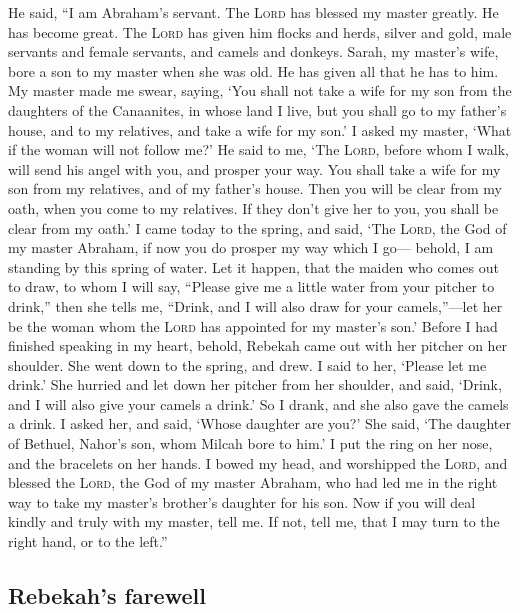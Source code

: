  He said, ``I am Abraham's servant.  The
\textsc{Lord} has blessed my master greatly. He has become great. The
\textsc{Lord} has given him flocks and herds, silver and gold, male
servants and female servants, and camels and donkeys. 
Sarah, my master's wife, bore a son to my master when she was old. He
has given all that he has to him.  My master made me
swear, saying, `You shall not take a wife for my son from the daughters
of the Canaanites, in whose land I live,  but you shall
go to my father's house, and to my relatives, and take a wife for my
son.'  I asked my master, `What if the woman will not
follow me?'  He said to me, `The \textsc{Lord}, before
whom I walk, will send his angel with you, and prosper your way. You
shall take a wife for my son from my relatives, and of my father's
house.  Then you will be clear from my oath, when you
come to my relatives. If they don't give her to you, you shall be clear
from my oath.'  I came today to the spring, and said,
`The \textsc{Lord}, the God of my master Abraham, if now you do prosper
my way which I go---  behold, I am standing by this
spring of water. Let it happen, that the maiden who comes out to draw,
to whom I will say, ``Please give me a little water from your pitcher to
drink,''  then she tells me, ``Drink, and I will also
draw for your camels,''---let her be the woman whom the \textsc{Lord}
has appointed for my master's son.'  Before I had
finished speaking in my heart, behold, Rebekah came out with her pitcher
on her shoulder. She went down to the spring, and drew. I said to her,
`Please let me drink.'  She hurried and let down her
pitcher from her shoulder, and said, `Drink, and I will also give your
camels a drink.' So I drank, and she also gave the camels a drink.
 I asked her, and said, `Whose daughter are you?' She
said, `The daughter of Bethuel, Nahor's son, whom Milcah bore to him.' I
put the ring on her nose, and the bracelets on her hands.
 I bowed my head, and worshipped the \textsc{Lord}, and
blessed the \textsc{Lord}, the God of my master Abraham, who had led me
in the right way to take my master's brother's daughter for his son.
 Now if you will deal kindly and truly with my master,
tell me. If not, tell me, that I may turn to the right hand, or to the
left.''

\hypertarget{rebekahs-farewell}{%
\subsection{Rebekah's farewell}\label{rebekahs-farewell}}

